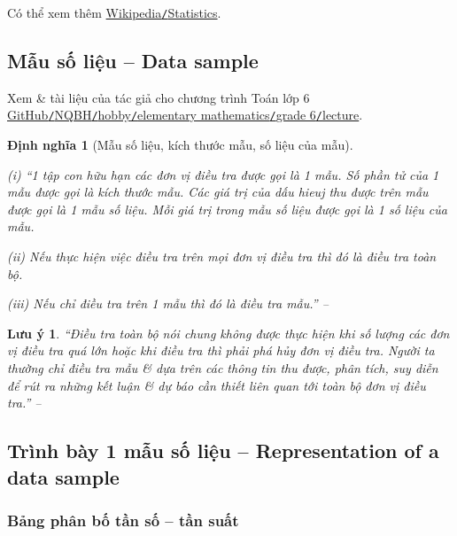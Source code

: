 \documentclass[oneside]{book}
\numberwithin{equation}{section}
\newtheorem{dinhnghia}{Định nghĩa}[section]
\newtheorem{luuy}{Lưu ý}[section]
\begin{document}
Có thể xem thêm \href{https://en.wikipedia.org/wiki/Statistics}{Wikipedia\texttt{/}Statistics}.

\subsection{Mẫu số liệu -- Data sample}
Xem \cite[Chap. IV: 1 Số Yếu Tố Thống Kê \& Xác Suất, pp. 3--24]{SGK_Toan_6_Canh_Dieu_tap_2} \& tài liệu của tác giả cho chương trình Toán lớp 6 \href{https://github.com/NQBH/hobby/blob/master/elementary_mathematics/grade_6/NQBH_elementary_mathematics_grade_6.pdf}{GitHub\texttt{/}NQBH\texttt{/}hobby\texttt{/}elementary mathematics\texttt{/}grade 6\texttt{/}lecture}.

\begin{dinhnghia}[Mẫu số liệu, kích thước mẫu, số liệu của mẫu]
	\begin{enumerate*}
		\item[(i)] ``1 tập con hữu hạn các đơn vị điều tra được gọi là 1 \emph{mẫu}. Số phần tử của 1 mẫu được gọi là \emph{kích thước mẫu}. Các giá trị của dấu hieuj thu được trên mẫu được gọi là 1 \emph{mẫu số liệu}. Mỗi giá trị trong mẫu số liệu được gọi là 1 \emph{số liệu của mẫu}.
		\item[(ii)] Nếu thực hiện việc điều tra trên mọi đơn vị điều tra thì đó là \emph{điều tra toàn bộ}.
		\item[(iii)] Nếu chỉ điều tra trên 1 mẫu thì đó là điều tra mẫu.'' -- \cite[p. 62]{TL_chuyen_Toan_Dai_So_Giai_Tich_11}
	\end{enumerate*}
\end{dinhnghia}

\begin{luuy}
	``Điều tra toàn bộ nói chung không được thực hiện khi số lượng các đơn vị điều tra quá lớn hoặc khi điều tra thì phải phá hủy đơn vị điều tra. Người ta thường chỉ điều tra mẫu \& dựa trên các thông tin thu được, phân tích, suy diễn để rút ra những kết luận \& dự báo cần thiết liên quan tới toàn bộ đơn vị điều tra.'' -- \cite[p. 62]{TL_chuyen_Toan_Dai_So_Giai_Tich_11}
\end{luuy}

\subsection{Trình bày 1 mẫu số liệu -- Representation of a data sample}

\subsubsection{Bảng phân bố tần số -- tần suất}
\end{document}
